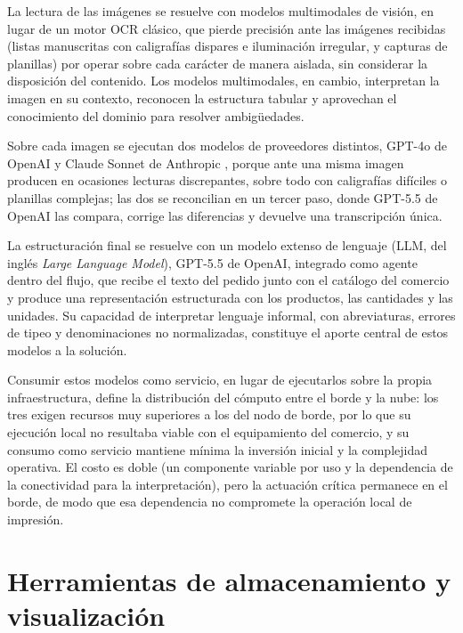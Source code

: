 La lectura de las imágenes se resuelve con modelos multimodales de visión, en lugar de un motor OCR clásico, que pierde precisión ante las imágenes recibidas (listas manuscritas con caligrafías dispares e iluminación irregular, y capturas de planillas) por operar sobre cada carácter de manera aislada, sin considerar la disposición del contenido. Los modelos multimodales, en cambio, interpretan la imagen en su contexto, reconocen la estructura tabular y aprovechan el conocimiento del dominio para resolver ambigüedades.

Sobre cada imagen se ejecutan dos modelos de proveedores distintos, GPT-4o de OpenAI \cite{gpt4o} y Claude Sonnet de Anthropic \cite{claudesonnet}, porque ante una misma imagen producen en ocasiones lecturas discrepantes, sobre todo con caligrafías difíciles o planillas complejas; las dos se reconcilian en un tercer paso, donde GPT-5.5 de OpenAI \cite{gpt55} las compara, corrige las diferencias y devuelve una transcripción única.

La estructuración final se resuelve con un modelo extenso de lenguaje (LLM, del inglés \textit{Large Language Model}), GPT-5.5 de OpenAI, integrado como agente dentro del flujo, que recibe el texto del pedido junto con el catálogo del comercio y produce una representación estructurada con los productos, las cantidades y las unidades. Su capacidad de interpretar lenguaje informal, con abreviaturas, errores de tipeo y denominaciones no normalizadas, constituye el aporte central de estos modelos a la solución.

Consumir estos modelos como servicio, en lugar de ejecutarlos sobre la propia infraestructura, define la distribución del cómputo entre el borde y la nube: los tres exigen recursos muy superiores a los del nodo de borde, por lo que su ejecución local no resultaba viable con el equipamiento del comercio, y su consumo como servicio mantiene mínima la inversión inicial y la complejidad operativa. El costo es doble (un componente variable por uso y la dependencia de la conectividad para la interpretación), pero la actuación crítica permanece en el borde, de modo que esa dependencia no compromete la operación local de impresión.


\section{Herramientas de almacenamiento y visualización}
\label{sec:almacenamiento_visualizacion}

